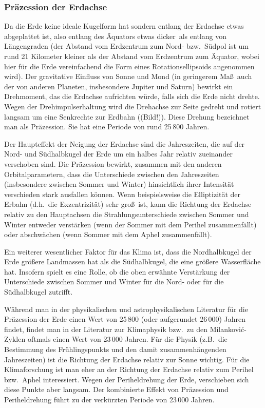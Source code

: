 \subsubsection{Pr\"azession der Erdachse} 

Da die Erde keine ideale Kugelform hat sondern entlang der Erdachse
etwas abgeplattet ist, also entlang des \"Aquators etwas \glqq dicker\grqq\ als entlang von L\"angengraden
(der Abstand vom Erdzentrum zum Nord- bzw.\ S\"udpol ist um rund 21 Kilometer kleiner als der 
Abstand vom Erdzentrum zum \"Aquator, wobei hier f\"ur die Erde vereinfachend die Form eines
Rotationsellipsoids angenommen wird). Der gravitative Einfluss von Sonne und Mond (in geringerem Ma\ss\
auch der von anderen Planeten, insbesondere Jupiter und Saturn) bewirkt ein Drehmoment, das 
die Erdachse aufrichten w\"urde, falls sich die Erde nicht drehte. Wegen der Drehimpulserhaltung wird
die Drehachse zur Seite gedreht und rotiert langsam um eine Senkrechte zur Erdbahn ((Bild!)).
Diese Drehung bezeichnet man als Pr\"azession. Sie hat eine Periode von rund 25\,800 Jahren.

Der Haupteffekt der Neigung der Erdachse sind die Jahreszeiten, die auf der Nord- und S\"udhalbkugel
der Erde um ein halbes Jahr relativ zueinander verschoben sind. Die Pr\"azession bewirkt, zusammen mit
den anderen Orbitalparametern, dass die Unterschiede zwischen den Jahreszeiten (insbesondere
zwischen Sommer und Winter) hinsichtlich ihrer Intensit\"at verschieden stark ausfallen k\"onnen.
Wenn beispielsweise die Elliptizit\"at der Erbahn (d.h.\ die Exzentrizit\"at) sehr gro\ss\ ist, kann
die Richtung der Erdachse relativ zu den Hauptachsen die Strahlungsunterschiede zwischen Sommer
und Winter entweder verst\"arken (wenn der Sommer mit dem Perihel zusammenf\"allt) oder
abschw\"achen (wenn Sommer mit dem Aphel zusammenf\"allt). 

Ein weiterer wesentlicher Faktor f\"ur das Klima ist, dass die Nordhalbkugel der Erde gr\"o\ss ere
Landmassen hat als die S\"udhalbkugel, die eine gr\"o\ss ere Wasserfl\"ache hat. Insofern spielt es
eine Rolle, ob die oben erw\"ahnte Verst\"arkung der Unterschiede zwischen Sommer und Winter
f\"ur die Nord- oder f\"ur die S\"udhalbkugel zutrifft.  

W\"ahrend man in der physikalischen und astrophysikalischen Literatur f\"ur die Pr\"azession der
Erde einen Wert von 25\,800 (oder aufgerundet 26\,000) Jahren findet, findet man in der
Literatur zur Klimaphysik bzw.\ zu den Milankovi\'c-Zyklen
oftmals einen Wert von 23\,000 Jahren. F\"ur die Physik (z.B.\ die
Bestimmung des Fr\"uhlingspunkts und den damit zusammenh\"angenden Jahreszeiten) ist
die Richtung der Erdachse relativ zur Sonne wichtig. F\"ur die Klimaforschung ist man eher an der
Richtung der Erdachse relativ zum Perihel bzw.\ Aphel interessiert. Wegen der Periheldrehung
der Erde, verschieben sich diese Punkte aber langsam. Der kombinierte Effekt von 
Pr\"azession und Periheldrehung f\"uhrt zu der verk\"urzten Periode von 23\,000 Jahren. 


